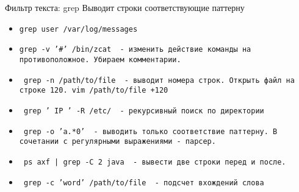\begin{frame}[fragile]{Фильтр текста: grep}
Выводит строки соответствующие паттерну

\begin{itemize}
    \item \tt{grep \alert{user} /var/log/messages }
    \item \tt{grep \alert{-v} '\#' /bin/zcat } - изменить действие команды на противоположное. Убираем комментарии.

    \item \tt{ grep \alert{-n} /path/to/file } - выводит номера строк. Открыть файл на строке 120. vim /path/to/file +120

    \item \tt{ grep ' IP ' \alert{-R} /etc/ } - рекурсивный поиск по директории

    \item \tt{ grep \alert{-o} 'a.*0' }  - выводить только соответствие паттерну. В сочетании с регулярными выражениями - парсер.

    \item \tt{ ps axf | grep \alert{-C 2} java } - вывести две строки перед и после.

    \item \tt{ grep \alert{-c} 'word' /path/to/file } - подсчет вхождений слова
\end{itemize}
    
\end{frame}
